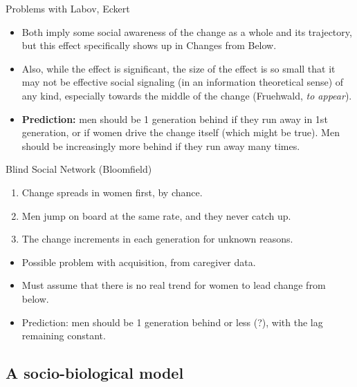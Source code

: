 \documentclass[hyperref={pdfpagelabels=false}]{beamer}
\begin{document}
\begin{frame}{Problems with Labov, Eckert}
	\begin{itemize}
	\item Both imply some social awareness of the change as a whole and its trajectory, but this effect specifically shows up in Changes from Below.
	\item Also, while the effect is significant, the size of the effect is so small that it may not be effective social signaling (in an information theoretical sense) of any kind, especially towards the middle of the change (Fruehwald, \textsl{to appear}).
	\item \textbf{Prediction:} men should be 1 generation behind if they run away in 1st generation, or if women drive the change itself (which might be true). Men should be increasingly more behind if they run away many times.
	\end{itemize}
\end{frame}


\begin{frame}{Blind Social Network (Bloomfield)}
	\begin{enumerate}
	\item Change spreads in women first, by chance.
	\item Men jump on board at the same rate, and they never catch up.
	\item The change increments in each generation for unknown reasons.
	\end{enumerate}
	\begin{itemize}
	\item Possible problem with acquisition, from caregiver data.
	\item Must assume that there is no real trend for women to lead change from below.
	\item Prediction: men should be 1 generation behind or less (?), with the lag remaining constant.
	\end{itemize}
\end{frame}




\subsection{A socio-biological model}
\end{document}
